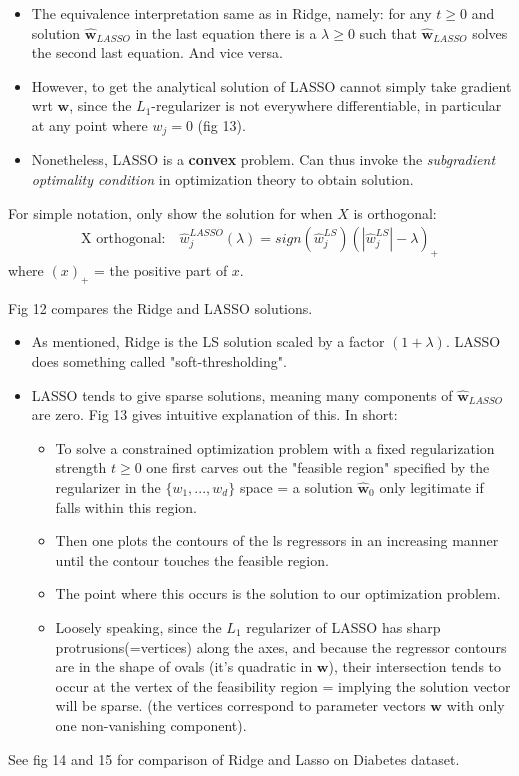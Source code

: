 \documentclass[norsk,a4paper,11pt]{article}
\begin{document}
\begin{itemize}
	\item The equivalence interpretation same as in Ridge, namely: for any $t \geq 0$ and solution $\hat{\mathbf{w}}_{LASSO}$ in the last equation there is a $\lambda \geq 0$ such that $\hat{\mathbf{w}}_{LASSO}$ solves the second last equation. And vice versa.
	\item However, to get the analytical solution of LASSO cannot simply take gradient wrt $\mathbf{w}$, since the $L_1$-regularizer is not everywhere differentiable, in particular at any point where $w_j = 0$ (fig 13). 
	\item Nonetheless, LASSO is a \textbf{convex} problem. Can thus invoke the \textit{subgradient optimality condition} in optimization theory to obtain solution. 
\end{itemize}
For simple notation, only show the solution for when $X$ is orthogonal:
\begin{align}
	\text{X orthogonal:} \quad \hat{w}_j^{LASSO} (\lambda) = sign(\hat{w}_j^{LS}) (|\hat{w}_j^{LS}| - \lambda)_+ 
\end{align}
where $(x)_+$ = the positive part of $x$.

Fig 12 compares the Ridge and LASSO solutions.
\begin{itemize}
	\item As mentioned, Ridge is the LS solution scaled by a factor $(1 + \lambda)$. LASSO does something called "soft-thresholding". 
	\item LASSO tends to give sparse solutions, meaning many components of $\hat{\mathbf{w}}_{LASSO}$ are zero. Fig 13 gives intuitive explanation of this. In short:
	\begin{itemize}
		\item To solve a constrained optimization problem with a fixed regularization strength $t \geq 0$ one first carves out the "feasible region" specified by the regularizer in the $\{ w_1, ..., w_d \}$ space = a solution $\hat{\mathbf{w}}_0$ only legitimate if falls within this region. 
		\item Then one plots the contours of the ls regressors in an increasing manner until the contour touches the feasible region. 
		\item The point where this occurs is the solution to our optimization problem. 
		\item Loosely speaking, since the $L_1$ regularizer of LASSO has sharp protrusions(=vertices) along the axes, and because the regressor contours are in the shape of ovals (it's quadratic in $\mathbf{w}$), their intersection tends to occur at the vertex of the feasibility region = implying the solution vector will be sparse. (the vertices correspond to parameter vectors $\mathbf{w}$ with only one non-vanishing component).
	\end{itemize}
\end{itemize}
See fig 14 and 15 for comparison of Ridge and Lasso on Diabetes dataset.
\end{document}
